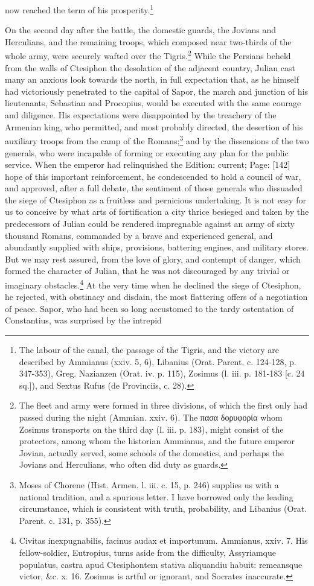 now reached the term of his prosperity.\footnote{The labour of the canal, the passage of the Tigris, and the victory are described by Ammianus (xxiv. 5, 6), Libanius (Orat. Parent. c. 124-128, p. 347-353), Greg. Nazianzen (Orat. iv. p. 115), Zosimus (l. iii. p. 181-183 [c. 24 sq.]), and Sextus Rufus (de Provinciis, c. 28).}

On the second day after the battle, the domestic guards, the Jovians and Herculians, and the remaining troops, which composed near two-thirds of the whole army, were securely wafted over the Tigris.\footnote{The fleet and army were formed in three divisions, of which the first only had passed during the night (Ammian. xxiv. 6). The \textgreek{πασα δορυφορία} whom Zosimus transports on the third day (l. iii. p. 183), might consist of the protectors, among whom the historian Ammianus, and the future emperor Jovian, actually served, some schools of the domestics, and perhaps the Jovians and Herculians, who often did duty as guards.} While the Persians beheld from the walls of Ctesiphon the desolation of the adjacent country, Julian cast many an anxious look towards the north, in full expectation that, as he himself had victoriously penetrated to the capital of Sapor, the march and junction of his lieutenants, Sebastian and Procopius, would be executed with the same courage and diligence. His expectations were disappointed by the treachery of the Armenian king, who permitted, and most probably directed, the desertion of his auxiliary troops from the camp of the Romans;\footnote{Moses of Chorene (Hist. Armen. l. iii. c. 15, p. 246) supplies us with a national tradition, and a spurious letter. I have borrowed only the leading circumstance, which is consistent with truth, probability, and Libanius (Orat. Parent. c. 131, p. 355).} and by the dissensions of the two generals, who were incapable of forming or executing any plan for the public service. When the emperor had relinquished the Edition: current; Page: [142] hope of this important reinforcement, he condescended to hold a council of war, and approved, after a full debate, the sentiment of those generals who dissuaded the siege of Ctesiphon as a fruitless and pernicious undertaking. It is not easy for us to conceive by what arts of fortification a city thrice besieged and taken by the predecessors of Julian could be rendered impregnable against an army of sixty thousand Romans, commanded by a brave and experienced general, and abundantly supplied with ships, provisions, battering engines, and military stores. But we may rest assured, from the love of glory, and contempt of danger, which formed the character of Julian, that he was not discouraged by any trivial or imaginary obstacles.\footnote{Civitas inexpugnabilis, facinus audax et importunum. Ammianus, xxiv. 7. His fellow-soldier, Eutropius, turns aside from the difficulty, Assyriamque populatus, castra apud Ctesiphontem stativa aliquandiu habuit: remeansque victor, \&c. x. 16. Zosimus is artful or ignorant, and Socrates inaccurate.} At the very time when he declined the siege of Ctesiphon, he rejected, with obstinacy and disdain, the most flattering offers of a negotiation of peace. Sapor, who had been so long accustomed to the tardy ostentation of Constantius, was surprised by the intrepid 